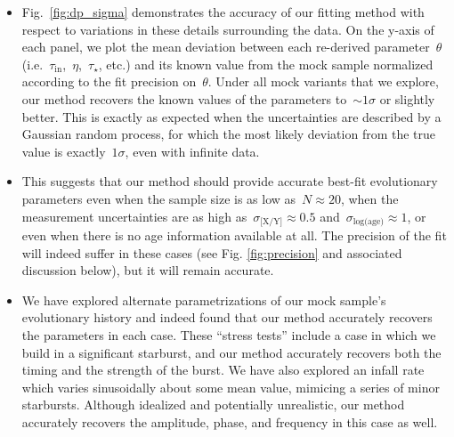 \documentclass[ms.tex]{subfiles}
\begin{document}
\begin{itemize}
	\item Fig.~\ref{fig:dp_sigma} demonstrates the accuracy of our fitting
	method with respect to variations in these details surrounding the data.
	On the y-axis of each panel, we plot the mean deviation between each
	re-derived parameter~$\theta$ (i.e.~$\tau_\text{in}$,~$\eta$,~$\tau_\star$,
	etc.) and its known value from the mock sample normalized according to the
	fit precision on~$\theta$.
	Under all mock variants that we explore, our method recovers the known
	values of the parameters to~$\sim1\sigma$ or slightly better.
	This is exactly as expected when the uncertainties are described by a
	Gaussian random process, for which the most likely deviation from the true
	value is exactly~$1\sigma$, even with infinite data.

	\item This suggests that our method should provide accurate best-fit
	evolutionary parameters even when the sample size is as low
	as~$N \approx 20$, when the measurement uncertainties are as high
	as~$\sigma_\text{[X/Y]} \approx 0.5$ and~$\sigma_\text{log(age)} \approx 1$,
	or even when there is no age information available at all.
	The precision of the fit will indeed suffer in these cases (see Fig.
	\ref{fig:precision} and associated discussion below), but it will remain
	accurate.

	\item We have explored alternate parametrizations of our mock sample's
	evolutionary history and indeed found that our method accurately recovers
	the parameters in each case.
	These ``stress tests'' include a case in which we build in a significant
	starburst, and our method accurately recovers both the timing and the
	strength of the burst.
	We have also explored an infall rate which varies sinusoidally about some
	mean value, mimicing a series of minor starbursts.
	Although idealized and potentially unrealistic, our method accurately
	recovers the amplitude, phase, and frequency in this case as well.
 

\end{itemize}
\end{document}
